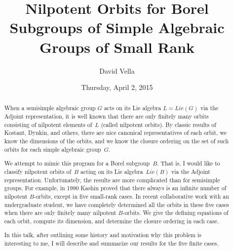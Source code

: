 \documentclass{UAmathtalk}
\author{David Vella}
\title{Nilpotent Orbits for Borel Subgroups of Simple Algebraic Groups of Small Rank}
\date{Thursday, April 2, 2015}
\begin{document}
\maketitle

\vspace{-1ex}
\begin{abstract}
When a semisimple algebraic group $G$ acts on its Lie algebra $L = \mathit{Lie}(G)$ via the Adjoint representation, it is well known that there are only finitely many orbits consisting of nilpotent elements of~$L$ (called nilpotent orbits).  By classic results of Kostant, Dynkin, and others, there are nice canonical representatives of each orbit, we know the dimensions of the orbits, and we know the closure ordering on the set of such orbits for each simple algebraic group~$G$.

We attempt to mimic this program for a Borel subgroup~$B$.  That is, I would like to classify nilpotent orbits of~$B$ acting on its Lie algebra~$\mathit{Lie}(B)$ via the Adjoint representation.   Unfortunately, the results are more complicated than for semisimple groups.  For example, in 1990 Kashin proved that there always is an infinite number of nilpotent $B$-orbits, except in five small-rank cases.  In recent collaborative work with an undergraduate student, we have completely determined all the orbits in these five cases when there are only finitely many nilpotent $B$-orbits.  We give the defining equations of each orbit, compute its dimension, and determine the closure ordering in each case.

In this talk, after outlining some history and motivation why this problem is interesting to me, I will describe and summarize our results for the five finite cases.
\end{abstract}
\end{document}
